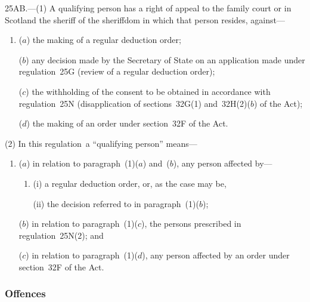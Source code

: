 \documentclass[12pt,a4paper]{article}
\begin{document}
25AB.---(1)  A qualifying person has a right of appeal to 
the family court  %
or in Scotland the sheriff of the sheriffdom in which that person resides, against—
\begin{enumerate}\item[]
($a$) the making of a regular deduction order;

($b$) any decision made by the 
Secretary of State  %
on an application made under regulation~25G (review of a regular deduction order);

($c$) the withholding of the consent to be obtained in accordance with regulation~25N (disapplication of sections~32G(1) and~32H(2)($b$)  of the Act);

($d$) the making of an order under section~32F of the Act.
\end{enumerate}

(2) In this regulation~a “qualifying person” means—
\begin{enumerate}\item[]
($a$) in relation to paragraph~(1)($a$)  and~($b$), any person affected by—
\begin{enumerate}\item[]
(i) a regular deduction order, or, as the case may be,

(ii) the decision referred to in paragraph~(1)($b$);
\end{enumerate}

($b$) in relation to paragraph~(1)($c$), the persons prescribed in regulation~25N(2); and

($c$) in relation to paragraph~(1)($d$), any person affected by an order under section~32F of the Act.
\end{enumerate}


\subsubsection[25AC. Offences]{Offences}
\end{document}
